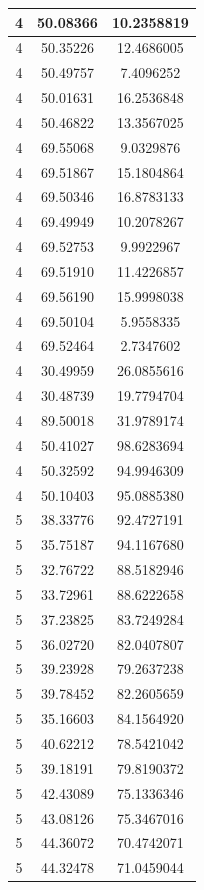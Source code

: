\documentclass[
]{book}
\begin{document}
\begin{tabular}{c|c|c}
\hline
4 & 50.08366 & 10.2358819\\
\hline
4 & 50.35226 & 12.4686005\\
\hline
4 & 50.49757 & 7.4096252\\
\hline
4 & 50.01631 & 16.2536848\\
\hline
4 & 50.46822 & 13.3567025\\
\hline
4 & 69.55068 & 9.0329876\\
\hline
4 & 69.51867 & 15.1804864\\
\hline
4 & 69.50346 & 16.8783133\\
\hline
4 & 69.49949 & 10.2078267\\
\hline
4 & 69.52753 & 9.9922967\\
\hline
4 & 69.51910 & 11.4226857\\
\hline
4 & 69.56190 & 15.9998038\\
\hline
4 & 69.50104 & 5.9558335\\
\hline
4 & 69.52464 & 2.7347602\\
\hline
4 & 30.49959 & 26.0855616\\
\hline
4 & 30.48739 & 19.7794704\\
\hline
4 & 89.50018 & 31.9789174\\
\hline
4 & 50.41027 & 98.6283694\\
\hline
4 & 50.32592 & 94.9946309\\
\hline
4 & 50.10403 & 95.0885380\\
\hline
5 & 38.33776 & 92.4727191\\
\hline
5 & 35.75187 & 94.1167680\\
\hline
5 & 32.76722 & 88.5182946\\
\hline
5 & 33.72961 & 88.6222658\\
\hline
5 & 37.23825 & 83.7249284\\
\hline
5 & 36.02720 & 82.0407807\\
\hline
5 & 39.23928 & 79.2637238\\
\hline
5 & 39.78452 & 82.2605659\\
\hline
5 & 35.16603 & 84.1564920\\
\hline
5 & 40.62212 & 78.5421042\\
\hline
5 & 39.18191 & 79.8190372\\
\hline
5 & 42.43089 & 75.1336346\\
\hline
5 & 43.08126 & 75.3467016\\
\hline
5 & 44.36072 & 70.4742071\\
\hline
5 & 44.32478 & 71.0459044\\

\end{tabular}
\end{document}

